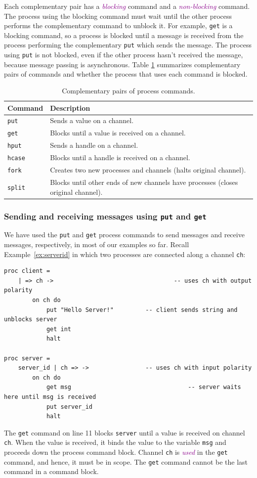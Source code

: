 \documentclass[acmsmall]{acmart}
\newcommand{\tc}[1]{\textcolor{darkMagenta}{\textit{#1}}}
\begin{document}
Each complementary pair has a \tc{blocking} command and a \tc{non-blocking} command.
The process using the blocking command must wait until the other process performs the complementary command to unblock it. 
For example, \lstinline$get$ is a blocking command, so a process is blocked until a message is received from the process performing the complementary \lstinline$put$ which sends the message.
The process using \lstinline$put$ is not blocked, even if the other process hasn't received the message, because message passing is asynchronous.
Table \ref{tab:mpl-constructs} summarizes complementary pairs of commands and whether the process that uses each command is blocked.
 \begin{table}[!h]
\centering
\caption{Complementary pairs of process commands.}
\label{tab:mpl-constructs}
	\begin{tabular}{|l|l|}
	\hline
	{\bf Command} & {\bf Description} \\
	\hline
	\lstinline$put$ & Sends a value on a channel. \\ 
	\lstinline$get$ & Blocks until a value is received on a channel. \\ \hline
	\lstinline$hput$ & Sends a handle on a channel. \\ 
	\lstinline$hcase$ & Blocks until a handle is received on a channel. \\ \hline
	\lstinline$fork$ & Creates two new processes and channels (halts original channel). \\ 
	\lstinline$split$ & Blocks until other ends of new channels have processes (closes original channel). \\ \hline
	\end{tabular}
\end{table} 


\subsubsection{Sending and receiving messages using \lstinline$put$ and \lstinline$get$}
\label{subsec:put-get}

We have used the \lstinline$put$ and \lstinline$get$ process commands to send messages and receive messages, respectively, in most of our examples so far.
Recall Example~\ref{ex:serverid} in which two processes are connected along a channel \lstinline$ch$:
\begin{lstlisting}
proc client =
	| => ch ->									-- uses ch with output polarity
		on ch do 
			put "Hello Server!"			-- client sends string and unblocks server
			get int					
			halt

proc server =
	server_id | ch => ->				-- uses ch with input polarity
		on ch do
			get msg									-- server waits here until msg is received
			put server_id						
			halt
\end{lstlisting}
The \lstinline$get$ command on line 11 blocks \lstinline$server$ until a value is received on channel \lstinline$ch$.
When the value is received, it binds the value to the variable \lstinline$msg$ and proceeds down the process command block. 
Channel \lstinline$ch$ is \tc{used} in the \lstinline$get$ command, and hence, it must be in scope. 
The \lstinline$get$ command cannot be the last command in a command block. 
\end{document}
